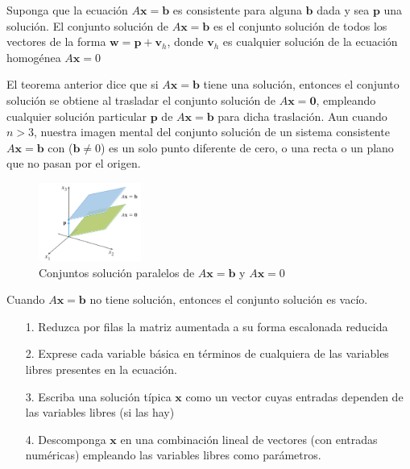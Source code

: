 \documentclass{article}
\begin{document}
\begin{tcolorbox}[colback=blue!10!white,colframe=blue!60!black,title=Conjunto solución]
    Suponga que la ecuación $A\mathbf{x} = \mathbf{b}$ es consistente para alguna $\mathbf{b}$ dada y sea $\mathbf{p}$ una solución. El conjunto solución de $A\mathbf{x} = \mathbf{b}$ es el conjunto solución de todos los vectores de la forma $\mathbf{w} = \mathbf{p} + \mathbf{v}_h$, donde $\mathbf{v}_h$ es cualquier solución de la ecuación homogénea $A\mathbf{x}=0$
\end{tcolorbox}

El teorema anterior dice que si $A\mathbf{x} = \mathbf{b}$ tiene una solución, entonces el conjunto solución se obtiene al trasladar el conjunto solución de $A\mathbf{x} = \mathbf{0}$, empleando cualquier solución particular $\mathbf{p}$ de $A\mathbf{x} = \mathbf{b}$ para dicha traslación. Aun cuando $n > 3$, nuestra imagen mental del conjunto solución de un sistema consistente $A\mathbf{x} = \mathbf{b}$ con ($\mathbf{b} \neq 0$) es un solo punto diferente de cero, o una recta o un plano que no pasan por el origen.

\begin{figure}[ht]
    \centerline{\includegraphics[width=0.3\textwidth]{img/image13.png}}
    \caption{Conjuntos solución paralelos de $A\mathbf{x} = \mathbf{b}$ y $A\mathbf{x} = 0$}
  \end{figure}

Cuando $A\mathbf{x} = \mathbf{b}$ no tiene solución, entonces el conjunto solución es vacío. \cite{DavidC}

\begin{tcolorbox}[colback=green!20!white,colframe=green!80!black,title=Conjunto Solución (de un Sistema Consistente) en Forma Vectorial Paramétrica]
    \begin{itemize}
        \item[1.] Reduzca por filas la matriz aumentada a su forma escalonada reducida
        \item[2.] Exprese cada variable básica en términos de cualquiera de las variables libres presentes en la ecuación.  
        \item[3.] Escriba una solución típica $\mathbf{x}$ como un vector cuyas entradas dependen de las variables libres (si las hay)
        \item[4.] Descomponga $\mathbf{x}$ en una combinación lineal de vectores (con entradas numéricas) empleando las variables libres como parámetros.  
    \end{itemize}
\end{tcolorbox}
\end{document}
